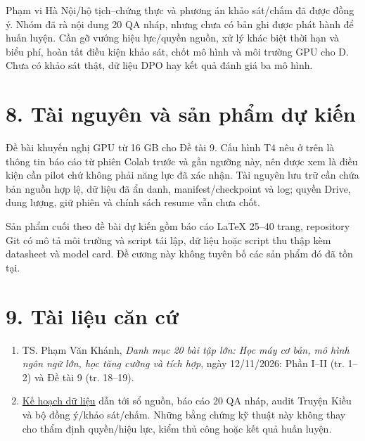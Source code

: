 \documentclass[11pt,a4paper]{article}
\providecommand{\tightlist}{\setlength{\itemsep}{0pt}\setlength{\parskip}{0pt}}
\begin{document}
Phạm vi Hà Nội/hộ tịch--chứng thực và phương án khảo sát/chấm đã được
đồng ý. Nhóm đã rà nội dung 20 QA nháp, nhưng chưa có bản ghi được phát
hành để huấn luyện. Cần gỡ vướng hiệu lực/quyền nguồn, xử lý khác biệt
thời hạn và biểu phí, hoàn tất điều kiện khảo sát, chốt mô hình và môi
trường GPU cho D. Chưa có khảo sát thật, dữ liệu DPO hay kết quả đánh
giá ba mô hình.

\section{8. Tài nguyên và sản phẩm dự
kiến}\label{tuxe0i-nguyuxean-vuxe0-sux1ea3n-phux1ea9m-dux1ef1-kiux1ebfn}

Đề bài khuyến nghị GPU từ 16 GB cho Đề tài 9. Cấu hình T4 nêu ở trên là
thông tin báo cáo từ phiên Colab trước và gần ngưỡng này, nên được xem
là điều kiện cần pilot chứ không phải năng lực đã xác nhận. Tài nguyên
lưu trữ cần chứa bản nguồn hợp lệ, dữ liệu đã ẩn danh,
manifest/checkpoint và log; quyền Drive, dung lượng, giữ phiên và chính
sách resume vẫn chưa chốt.

Sản phẩm cuối theo đề bài dự kiến gồm báo cáo LaTeX 25--40 trang,
repository Git có mô tả môi trường và script tái lập, dữ liệu hoặc
script thu thập kèm datasheet và model card. Đề cương này không tuyên bố
các sản phẩm đó đã tồn tại.

\section{9. Tài liệu căn cứ}\label{tuxe0i-liux1ec7u-cux103n-cux1ee9}

\begin{enumerate}
\def\labelenumi{\arabic{enumi}.}
\tightlist
\item
  TS. Phạm Văn Khánh, \emph{Danh mục 20 bài tập lớn: Học máy cơ bản, mô
  hình ngôn ngữ lớn, học tăng cường và tích hợp}, ngày 12/11/2026: Phần
  I--II (tr. 1--2) và Đề tài 9 (tr. 18--19).
\item
  \href{data-plan.pdf}{Kế hoạch dữ liệu} dẫn tới sổ nguồn, báo cáo 20 QA
  nháp, audit Truyện Kiều và bộ đồng ý/khảo sát/chấm. Những bằng chứng
  kỹ thuật này không thay cho thẩm định quyền/hiệu lực, kiểm thủ công
  hoặc kết quả huấn luyện.
\end{enumerate}
\end{document}
